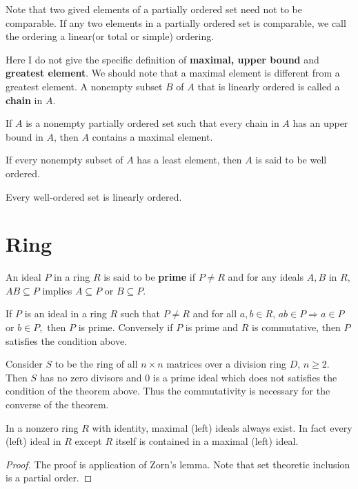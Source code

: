 \documentclass{article}
\begin{document}
Note that two gived elements of a partially ordered set need not to be comparable. If any two elements in a partially ordered set is comparable, we call the ordering a linear(or total or simple) ordering.

Here I do not give the specific definition of \textbf{maximal, upper bound} and \textbf{greatest element}. We should note that a maximal element is different from a greatest element. A nonempty subset $B$ of $A$ that is linearly ordered is called a \textbf{chain} in $A$.

\begin{lemma}
    If $A$ is a nonempty partially ordered set such that every chain in $A$ has an upper bound in $A$, then $A$ contains a maximal element.
\end{lemma}

\begin{definition}
    If every nonempty subset of $A$ has a least element, then $A$ is said to be well ordered.
\end{definition}

Every well-ordered set is linearly ordered.


\newpage
\section{Ring}
\begin{definition}
    An ideal $P$ in a ring $R$ is said to be \textbf{prime} if $P\neq R$ and for any ideals $A,B$ in $R$, $AB \subseteq P$ implies $A\subseteq P$ or $B \subseteq P$.
\end{definition}

\begin{theorem}
    If $P$ is an ideal in a ring $R$ such that $P\neq R$ and for all $a,b \in R$,
        $ab \in P \Rightarrow a \in P $ or $ b \in P,$
    then $P$ is prime. Conversely if $P$ is prime and $R$ is commutative, then $P$ satisfies the condition above.
\end{theorem}

Consider $S$ to be the ring of all $n \times n$ matrices over a division ring $D$, $n \geq 2$. Then $S$ has no zero divisors and $0$ is a prime ideal which does not satisfies the condition of the theorem above. Thus the commutativity is necessary for the converse of the theorem.

\begin{theorem}
    In a nonzero ring $R$ with identity, maximal (left) ideals always exist. In fact every (left) ideal in $R$ except $R$ itself is contained in a maximal (left) ideal.
\end{theorem}
\begin{proof}
    The proof is application of Zorn's lemma. Note that set theoretic inclusion is a partial order.
\end{proof}
\end{document}
